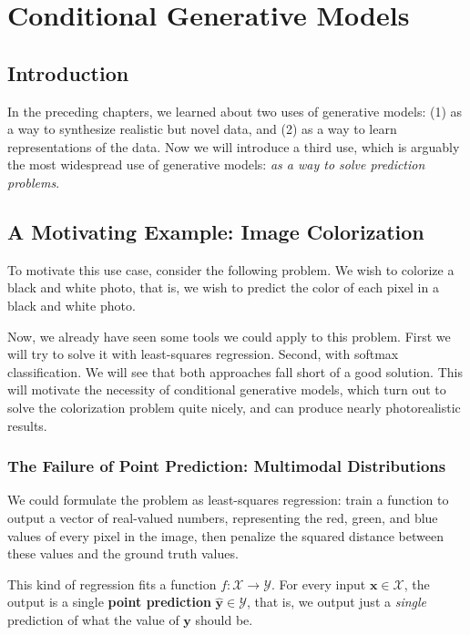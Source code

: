 \chapter{Conditional Generative Models}\label{chapter:conditional_generative_models}


\section{Introduction}

In the preceding chapters, we learned about two uses of generative models: (1) as a way to synthesize realistic but novel data, and (2) as a way to learn representations of the data. Now we will introduce a third use, which is arguably the most widespread use of generative models: \textit{as a way to solve prediction problems}.

\section{A Motivating Example: Image Colorization}

To motivate this use case, consider the following problem. We wish to colorize a black and white photo, that is, we wish to predict the color of each pixel in a black and white photo. 

Now, we already have seen some tools we could apply to this problem. First we will try to solve it with least-squares regression. Second, with softmax classification. We will see that both approaches fall short of a good solution. This will motivate the necessity of conditional generative models, which turn out to solve the colorization problem quite nicely, and can produce nearly photorealistic results.

\subsection{The Failure of Point Prediction: Multimodal Distributions}

We could formulate the problem as least-squares regression: train a function to output a vector of real-valued numbers, representing the red, green, and blue values of every pixel in the image, then penalize the squared distance between these values and the ground truth values.

This kind of regression fits a function $f: \mathcal{X} \rightarrow \mathcal{Y}$. For every input $\mathbf{x} \in \mathcal{X}$, the output is a single \textbf{point prediction} $\hat{\mathbf{y}} \in \mathcal{Y}$, that is, we output just a \textit{single} prediction of what the value of $\mathbf{y}$ should be.

